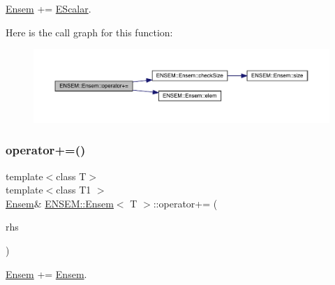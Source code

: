 \mbox{\hyperlink{classENSEM_1_1Ensem}{Ensem}} += \mbox{\hyperlink{classENSEM_1_1EScalar}{E\+Scalar}}. 

Here is the call graph for this function\+:
\nopagebreak
\begin{figure}[H]
\begin{center}
\leavevmode
\includegraphics[width=350pt]{d7/d3e/classENSEM_1_1Ensem_a3b36653814508e90b22543a3f1b465d5_cgraph}
\end{center}
\end{figure}
\mbox{\label{classENSEM_1_1Ensem_ae24bd27a7f5a8ffed6ad4361956596fd}} 
\subsubsection{\texorpdfstring{operator+=()}{operator+=()}\hspace{0.1cm}{\footnotesize\ttfamily [3/4]}}
{\footnotesize\ttfamily template$<$class T$>$ \\
template$<$class T1 $>$ \\
\mbox{\hyperlink{classENSEM_1_1Ensem}{Ensem}}\& \mbox{\hyperlink{classENSEM_1_1Ensem}{E\+N\+S\+E\+M\+::\+Ensem}}$<$ T $>$\+::operator+= (\begin{DoxyParamCaption}\item[{const \mbox{\hyperlink{classENSEM_1_1Ensem}{Ensem}}$<$ T1 $>$ \&}]{rhs }\end{DoxyParamCaption})\hspace{0.3cm}{\ttfamily [inline]}}



\mbox{\hyperlink{classENSEM_1_1Ensem}{Ensem}} += \mbox{\hyperlink{classENSEM_1_1Ensem}{Ensem}}. 

